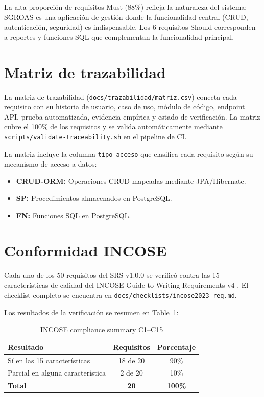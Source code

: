 La alta proporción de requisitos Must (88\%) refleja la naturaleza del sistema: SGROAS es una aplicación de gestión donde la funcionalidad central (CRUD, autenticación, seguridad) es indispensable. Los 6 requisitos Should corresponden a reportes y funciones SQL que complementan la funcionalidad principal.

\section{Matriz de trazabilidad}
\label{sec:traceability}

La matriz de trazabilidad (\texttt{docs/trazabilidad/matriz.csv}) conecta cada requisito con su historia de usuario, caso de uso, módulo de código, endpoint API, prueba automatizada, evidencia empírica y estado de verificación. La matriz cubre el 100\% de los requisitos y se valida automáticamente mediante \texttt{scripts/validate-traceability.sh} en el pipeline de CI.

La matriz incluye la columna \texttt{tipo\_acceso} que clasifica cada requisito según su mecanismo de acceso a datos:
\begin{itemize}
  \item \textbf{CRUD-ORM:} Operaciones CRUD mapeadas mediante JPA/Hibernate.
  \item \textbf{SP:} Procedimientos almacenados en PostgreSQL.
  \item \textbf{FN:} Funciones SQL en PostgreSQL.
\end{itemize}

\section{Conformidad INCOSE}
\label{sec:incose-compliance}

Cada uno de los 50 requisitos del SRS v1.0.0 se verificó contra las 15 características de calidad del INCOSE Guide to Writing Requirements v4 \cite{incose}. El checklist completo se encuentra en \texttt{docs/checklists/incose2023-req.md}.

Los resultados de la verificación se resumen en Table~\ref{tab:incose}:

\begin{table}[H]
\centering
\caption{INCOSE compliance summary C1--C15}
\label{tab:incose}
\begin{tabular}{lcc}
\toprule
\textbf{Resultado} & \textbf{Requisitos} & \textbf{Porcentaje} \\
\midrule
Sí en las 15 características & 18 de 20 & 90\% \\
Parcial en alguna característica & 2 de 20 & 10\% \\
\midrule
\textbf{Total} & \textbf{20} & \textbf{100\%} \\
\bottomrule
\end{tabular}
\end{table}

